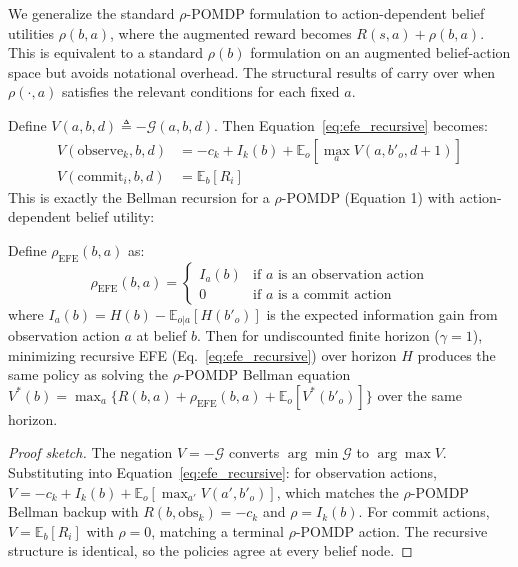 \documentclass[runningheads]{llncs}
\begin{document}
We generalize the standard $\rho$-POMDP formulation to action-dependent belief utilities $\rho(b, a)$, where the augmented reward becomes $R(s,a) + \rho(b,a)$. This is equivalent to a standard $\rho(b)$ formulation on an augmented belief-action space but avoids notational overhead. The structural results of \citet{araya2010} carry over when $\rho(\cdot, a)$ satisfies the relevant conditions for each fixed $a$.

Define $V(a, b, d) \triangleq -\mathcal{G}(a, b, d)$. Then Equation~\ref{eq:efe_recursive} becomes:
\begin{align}
    V(\text{observe}_k, b, d) &= -c_k + I_k(b) + \mathbb{E}_o\!\left[\max_a V(a, b'_o, d{+}1)\right] \label{eq:bellman_obs} \\
    V(\text{commit}_i, b, d) &= \mathbb{E}_b[R_i] \label{eq:bellman_commit}
\end{align}
This is exactly the Bellman recursion for a $\rho$-POMDP (Equation 1) with action-dependent belief utility:

\begin{proposition}
\label{prop:equivalence}
Define $\rho_{\mathrm{EFE}}(b, a)$ as:
\begin{equation*}
    \rho_{\mathrm{EFE}}(b, a) = \begin{cases} I_a(b) & \text{if } a \text{ is an observation action} \\ 0 & \text{if } a \text{ is a commit action} \end{cases}
\end{equation*}
where $I_a(b) = H(b) - \mathbb{E}_{o|a}[H(b'_o)]$ is the expected information gain from observation action $a$ at belief $b$. Then for undiscounted finite horizon ($\gamma{=}1$), minimizing recursive EFE (Eq.~\ref{eq:efe_recursive}) over horizon $H$ produces the same policy as solving the $\rho$-POMDP Bellman equation $V^*(b) = \max_a \{R(b,a) + \rho_{\mathrm{EFE}}(b,a) + \mathbb{E}_o[V^*(b'_o)]\}$ over the same horizon.
\end{proposition}
\begin{proof}[Proof sketch]
The negation $V = -\mathcal{G}$ converts $\arg\min \mathcal{G}$ to $\arg\max V$. Substituting into Equation~\ref{eq:efe_recursive}: for observation actions, $V = -c_k + I_k(b) + \mathbb{E}_o[\max_{a'} V(a', b'_o)]$, which matches the $\rho$-POMDP Bellman backup with $R(b, \text{obs}_k) = -c_k$ and $\rho = I_k(b)$. For commit actions, $V = \mathbb{E}_b[R_i]$ with $\rho = 0$, matching a terminal $\rho$-POMDP action. The recursive structure is identical, so the policies agree at every belief node.
\end{proof}
\end{document}
